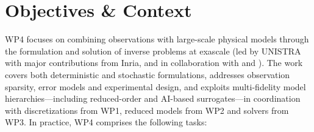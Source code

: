 
\section{Objectives \& Context}
\label{sec:wp4:objectives}

WP4 focuses on combining observations with large-scale physical models
through the formulation and solution of inverse problems at exascale
(led by UNISTRA with major contributions from Inria, and in collaboration
with \exadost{} and \exaatow{}). The work covers both deterministic and
stochastic formulations, addresses observation sparsity, error models and
experimental design, and exploits multi-fidelity model hierarchies---including
reduced-order and AI-based surrogates---in coordination with discretizations
from WP1, reduced models from WP2 and solvers from WP3. In practice, WP4
comprises the following tasks:

